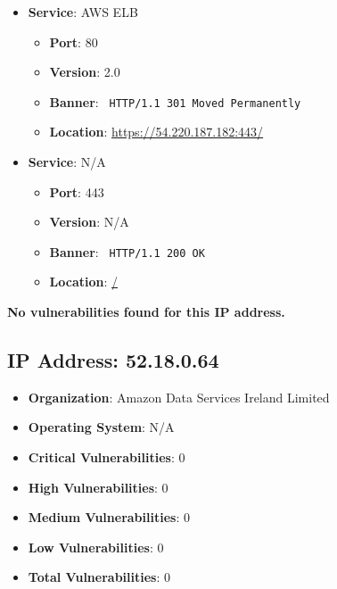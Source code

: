 \documentclass{article}
\begin{document}
\begin{itemize}
    
        \item \textbf{Service}: AWS ELB
        \begin{itemize}
            \item \textbf{Port}: 80
            \item \textbf{Version}:  2.0 
            \item \textbf{Banner}: \texttt{ HTTP/1.1 301 Moved Permanently
 }
            \item \textbf{Location}: \href{ https://54.220.187.182:443/ }{ https://54.220.187.182:443/ }
        \end{itemize}
    
        \item \textbf{Service}: N/A
        \begin{itemize}
            \item \textbf{Port}: 443
            \item \textbf{Version}:  N/A 
            \item \textbf{Banner}: \texttt{ HTTP/1.1 200 OK
 }
            \item \textbf{Location}: \href{ / }{ / }
        \end{itemize}
    
\end{itemize}


\textbf{No vulnerabilities found for this IP address.}


\clearpage



\subsection*{IP Address: 52.18.0.64}

\begin{itemize}
    \item \textbf{Organization}: Amazon Data Services Ireland Limited
    \item \textbf{Operating System}:  N/A 
    \item \textbf{Critical Vulnerabilities}: 0
    \item \textbf{High Vulnerabilities}: 0
    \item \textbf{Medium Vulnerabilities}: 0
    \item \textbf{Low Vulnerabilities}: 0
    \item \textbf{Total Vulnerabilities}: 0
\end{itemize}
\end{document}
